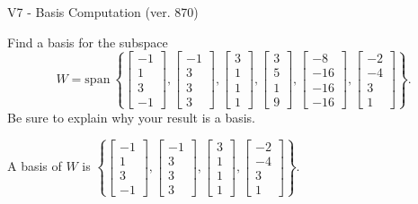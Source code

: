 \begin{exercise}
  \begin{exerciseTitle}V7 - Basis Computation (ver. 870)\end{exerciseTitle}
  \begin{exerciseStatement}
    Find a basis for the subspace 
\[W=\mathrm{span}\ \left\{\left[\begin{array}{r}
-1 \\
1 \\
3 \\
-1
\end{array}\right] , \left[\begin{array}{r}
-1 \\
3 \\
3 \\
3
\end{array}\right] , \left[\begin{array}{r}
3 \\
1 \\
1 \\
1
\end{array}\right] , \left[\begin{array}{r}
3 \\
5 \\
1 \\
9
\end{array}\right] , \left[\begin{array}{r}
-8 \\
-16 \\
-16 \\
-16
\end{array}\right] , \left[\begin{array}{r}
-2 \\
-4 \\
3 \\
1
\end{array}\right]\right\}.\]
 Be sure to explain why your result is a basis.


  \end{exerciseStatement}
  \begin{exerciseAnswer}
   A basis of \(W\) is  \(\left\{\left[\begin{array}{r}
-1 \\
1 \\
3 \\
-1
\end{array}\right] , \left[\begin{array}{r}
-1 \\
3 \\
3 \\
3
\end{array}\right] , \left[\begin{array}{r}
3 \\
1 \\
1 \\
1
\end{array}\right] , \left[\begin{array}{r}
-2 \\
-4 \\
3 \\
1
\end{array}\right]\right\}\).
  


  \end{exerciseAnswer}
\end{exercise}